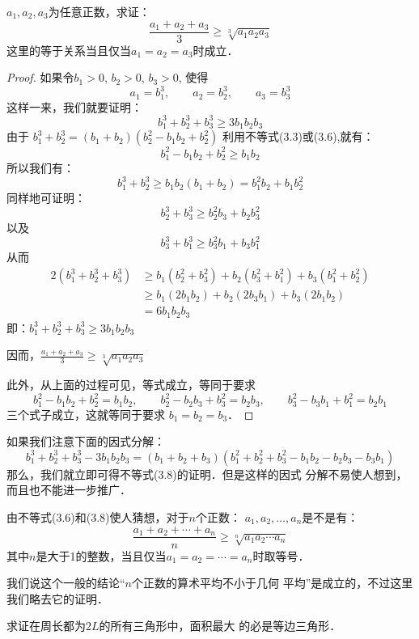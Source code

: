 \begin{example}
$a_1,a_2,a_3$为任意正数，求证：
\begin{equation}
 \frac{a_1+a_2+a_3}{3}\ge \sqrt[3]{a_1a_2a_3}  
\end{equation}
这里的等于关系当且仅当$a_1=a_2=a_3$时成立．
\end{example}

\begin{proof}
    如果令$b_1>0$, $b_2>0$, $b_3>0$, 使得
\[a_1=b_1^3,\qquad a_2=b_2^3,\qquad  a_3=b_3^3\]
这样一来，我们就要证明：
\[b_1^3+b_2^3+b_3^3\ge 3b_1b_2b_3\]
由于
$b_1^3+b_2^3=(b_1+b_2)(b_2^2-b_1b_2+b^2_2)$
利用不等式(3.3)或(3.6),就有：
\[b_1^2 -b_1b_2+b_2^2\ge b_1b_2\]
所以我们有：
\[b^3_1+b_2^3\ge b_1b_2(b_1+b_2)=b_1^2 b_2+b_1b_2^2\]
同样地可证明：
\[b_2^3+b_3^3\ge b_2^2b_3+b_2b^2_3\]
以及
\[b_3^3+b_1^3\ge b_3^2b_1+b_3b^2_1\]
从而
\[\begin{split}
    2(b_1^3+b_2^3+b_3^3) &\ge b_1(b^2_2+b^2_3)+b_2(b^2_3+b^2_1)+b_3(b^2_1+b^2_2)\\
    &\ge b_1(2b_1b_2)+b_2(2b_3b_1)+b_3(2b_1b_2)\\
    &=6b_1b_2b_3
\end{split}\]
即：$b_1^3+b_2^3+b_3^3\ge 3b_1b_2b_3$

因而，$\frac{a_1+a_2+a_3}{3}\ge \sqrt[3]{a_1a_2a_3}  $

此外，从上面的过程可见，等式成立，等同于要求
\[b_1^2-b_1b_2 +b_2^2=b_1b_2,\qquad  b_2^2 -b_2b_3+b_3^2 =b_2b_3,\qquad b_3^2-b_3b_1+b_1^2=b_2b_1\]
三个式子成立，这就等同于要求
$b_1=b_2=b_3$．
\end{proof}

\begin{rmk}
    如果我们注意下面的因式分解：
    \[b_1^3+b_2^3+b_3^3-3b_1b_2b_3=(b_1+b_2+b_3)(b_1^2+b_2^2
    +b^2_3-b_1b_2-b_2b_3-b_3b_1)\]
    那么，我们就立即可得不等式(3.8)的证明．但是这样的因式
    分解不易使人想到，而且也不能进一步推广． 
\end{rmk}

由不等式(3.6)和(3.8)使人猜想，对于$n$个正数：
$a_1,a_2,\ldots,a_n$是不是有：
\[\frac{a_1+a_2+\cdots+a_n}{n}\ge \sqrt[n]{a_1a_2\cdots a_n}\]
其中$n$是大于1的整数，当且仅当$a_1=a_2=\cdots=a_n$时取等号．

我们说这个一般的结论“$n$个正数的算术平均不小于几何
平均”是成立的，不过这里我们略去它的证明．

\begin{example}
    求证在周长都为$2L$的所有三角形中，面积最大
的必是等边三角形．
\end{example}

